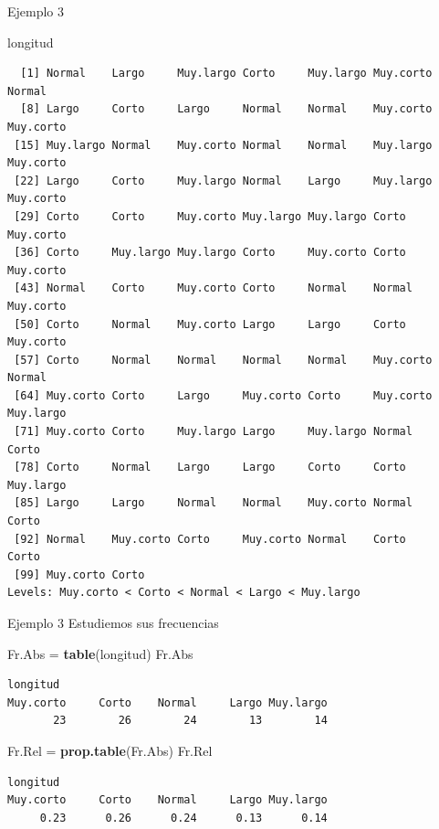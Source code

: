 \documentclass[
  ignorenonframetext,
]{beamer}
\newenvironment{Shaded}{\begin{snugshade}}{\end{snugshade}}
\newcommand{\FunctionTok}[1]{\textcolor[rgb]{0.13,0.29,0.53}{\textbf{#1}}}
\newcommand{\NormalTok}[1]{#1}
\newcommand{\OtherTok}[1]{\textcolor[rgb]{0.56,0.35,0.01}{#1}}
\begin{document}
\begin{frame}[fragile]{Ejemplo 3}
\label{ejemplo-3-6}
\begin{Shaded}
\begin{Highlighting}[]
\NormalTok{longitud}
\end{Highlighting}
\end{Shaded}

\begin{verbatim}
  [1] Normal    Largo     Muy.largo Corto     Muy.largo Muy.corto Normal   
  [8] Largo     Corto     Largo     Normal    Normal    Muy.corto Muy.corto
 [15] Muy.largo Normal    Muy.corto Normal    Normal    Muy.largo Muy.corto
 [22] Largo     Corto     Muy.largo Normal    Largo     Muy.largo Muy.corto
 [29] Corto     Corto     Muy.corto Muy.largo Muy.largo Corto     Muy.corto
 [36] Corto     Muy.largo Muy.largo Corto     Muy.corto Corto     Muy.corto
 [43] Normal    Corto     Muy.corto Corto     Normal    Normal    Muy.corto
 [50] Corto     Normal    Muy.corto Largo     Largo     Corto     Muy.corto
 [57] Corto     Normal    Normal    Normal    Normal    Muy.corto Normal   
 [64] Muy.corto Corto     Largo     Muy.corto Corto     Muy.corto Muy.largo
 [71] Muy.corto Corto     Muy.largo Largo     Muy.largo Normal    Corto    
 [78] Corto     Normal    Largo     Largo     Corto     Corto     Muy.largo
 [85] Largo     Largo     Normal    Normal    Muy.corto Normal    Corto    
 [92] Normal    Muy.corto Corto     Muy.corto Normal    Corto     Corto    
 [99] Muy.corto Corto    
Levels: Muy.corto < Corto < Normal < Largo < Muy.largo
\end{verbatim}
\end{frame}

\begin{frame}[fragile]{Ejemplo 3}
\label{ejemplo-3-7}
Estudiemos sus frecuencias

\begin{Shaded}
\begin{Highlighting}[]
\NormalTok{Fr.Abs }\OtherTok{=} \FunctionTok{table}\NormalTok{(longitud)}
\NormalTok{Fr.Abs}
\end{Highlighting}
\end{Shaded}

\begin{verbatim}
longitud
Muy.corto     Corto    Normal     Largo Muy.largo 
       23        26        24        13        14 
\end{verbatim}

\begin{Shaded}
\begin{Highlighting}[]
\NormalTok{Fr.Rel }\OtherTok{=} \FunctionTok{prop.table}\NormalTok{(Fr.Abs)}
\NormalTok{Fr.Rel}
\end{Highlighting}
\end{Shaded}

\begin{verbatim}
longitud
Muy.corto     Corto    Normal     Largo Muy.largo 
     0.23      0.26      0.24      0.13      0.14 
\end{verbatim}
\end{frame}
\end{document}
